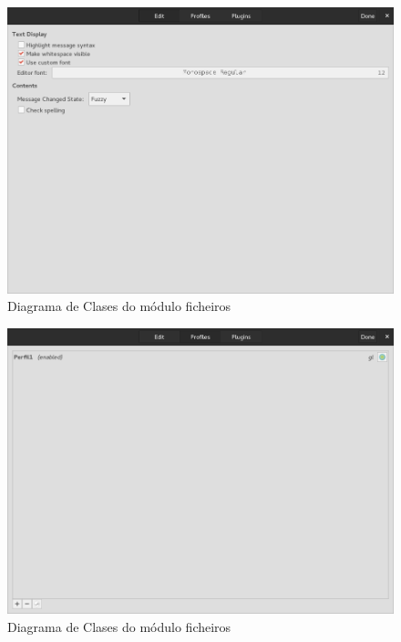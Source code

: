 \begin{figure}[h!]
    \centering
    \includegraphics[width=\textwidth]{img/panel_preferencias_edicion.png}
    \caption{Diagrama de Clases do módulo ficheiros}
    \label{fig:dia_class:files}
\end{figure}

\begin{figure}[h!]
    \centering
    \includegraphics[width=\textwidth]{img/panel_preferencias_perfiles.png}
    \caption{Diagrama de Clases do módulo ficheiros}
    \label{fig:dia_class:files}
\end{figure}

